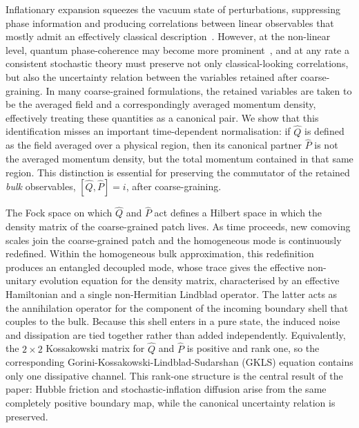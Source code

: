 \documentclass{article}
\numberwithin{equation}{section}
\begin{document}
	Inflationary expansion squeezes the vacuum state of perturbations, suppressing phase information and producing correlations between linear observables that mostly admit an effectively classical description~\cite{Martin:2015qta}. However, at the non-linear level, quantum phase-coherence may become more prominent~\cite{Green:2020whw, Launay:2024trh, Ireland:2026txt}, and at any rate a consistent stochastic theory must preserve not only classical-looking correlations, but also the uncertainty relation between the variables retained after coarse-graining. In many coarse-grained formulations, the retained variables are taken to be the averaged field and a correspondingly averaged momentum density, effectively treating these quantities as a canonical pair. We show that this identification misses an important time-dependent normalisation: if \(\hat Q\) is defined as the field averaged over a physical region, then its canonical partner $\hat{P}$ is not the averaged momentum density, but the total momentum contained in that same region. This distinction is essential for preserving the commutator of the retained \textit{bulk} observables, \([\hat Q,\hat P]=i\), after coarse-graining.

	The Fock space on which $\hat{Q}$ and $\hat{P}$ act defines a Hilbert space in which the density matrix of the coarse-grained patch lives. As time proceeds, new comoving scales join the coarse-grained patch and the homogeneous mode is continuously redefined. Within the homogeneous bulk approximation, this redefinition produces an entangled decoupled mode, whose trace gives the effective non-unitary evolution equation for the density matrix, characterised by an effective Hamiltonian and a single non-Hermitian Lindblad operator. The latter acts as the annihilation operator for the component of the incoming boundary shell that couples to the bulk. Because this shell enters in a pure state, the induced noise and dissipation are tied together rather than added independently. Equivalently, the \(2\times2\) Kossakowski matrix for \(\hat Q\) and \(\hat P\) is positive and rank one, so the corresponding Gorini-Kossakowski-Lindblad-Sudarshan (GKLS) equation \cite{gorini1976completely,lindblad1976generators,schlosshauer2007decoherence,wiseman2009quantum,petruccione} contains only one dissipative channel. This rank-one structure is the central result of the paper: Hubble friction and stochastic-inflation diffusion arise from the same completely positive boundary map, while the canonical uncertainty relation is preserved. 
\end{document}
